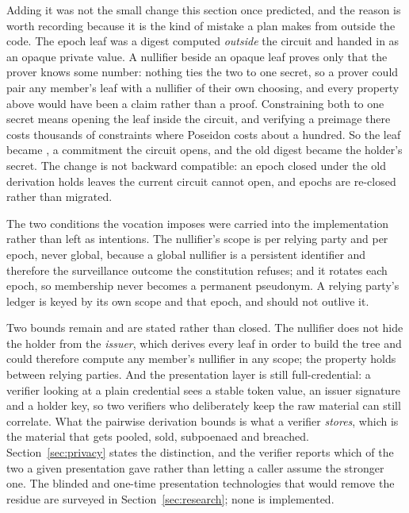 Adding it was not the small change this section once predicted, and the reason is worth recording
because it is the kind of mistake a plan makes from outside the code. The epoch leaf was a
 digest computed \emph{outside} the circuit and handed in as an opaque private
value. A nullifier beside an opaque leaf proves only that the prover knows some number: nothing ties
the two to one secret, so a prover could pair any member's leaf with a nullifier of their own
choosing, and every property above would have been a claim rather than a proof. Constraining both to
one secret means opening the leaf inside the circuit, and verifying a  preimage there
costs thousands of constraints where Poseidon costs about a hundred. So the leaf became
, a commitment the circuit opens, and the old digest became the
holder's secret. The change is not backward compatible: an epoch closed under the old derivation
holds leaves the current circuit cannot open, and epochs are re-closed rather than migrated.

The two conditions the vocation imposes were carried into the implementation rather than left as
intentions. The nullifier's scope is per relying party and per epoch, never global, because a global
nullifier is a persistent identifier and therefore the surveillance outcome the constitution refuses;
and it rotates each epoch, so membership never becomes a permanent pseudonym. A relying party's
ledger is keyed by its own scope and that epoch, and should not outlive it.

Two bounds remain and are stated rather than closed. The nullifier does not hide the holder from the
\emph{issuer}, which derives every leaf in order to build the tree and could therefore compute any
member's nullifier in any scope; the property holds between relying parties. And the presentation
layer is still full-credential: a verifier looking at a plain credential sees a stable token value,
an issuer signature and a holder key, so two verifiers who deliberately keep the raw material can
still correlate. What the pairwise derivation bounds is what a verifier \emph{stores}, which is the
material that gets pooled, sold, subpoenaed and breached. Section~\ref{sec:privacy} states the
distinction, and the verifier reports which of the two a given presentation gave rather than letting
a caller assume the stronger one. The blinded and one-time presentation technologies that would
remove the residue are surveyed in Section~\ref{sec:research}; none is implemented. \sFut

